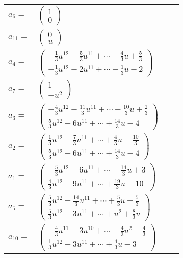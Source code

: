 \documentclass[1p]{elsarticle_modified}
\theoremstyle{definition}
\begin{document}
\begin{tabular}{m{7pt} m{180pt} m{7pt} m{180pt} }
\flushright $a_{6}=$&$\begin{pmatrix}1\\0\end{pmatrix}$ \\
\flushright $a_{11}=$&$\begin{pmatrix}0\\u\end{pmatrix}$ \\
\flushright $a_{4}=$&$\begin{pmatrix}-\frac{1}{3} u^{12}+\frac{5}{3} u^{11}+\cdots-\frac{4}{3} u+\frac{5}{3}\\-\frac{1}{3} u^{12}+2 u^{11}+\cdots-\frac{1}{3} u+2\end{pmatrix}$ \\
\flushright $a_{7}=$&$\begin{pmatrix}1\\- u^2\end{pmatrix}$ \\
\flushright $a_{3}=$&$\begin{pmatrix}-\frac{4}{3} u^{12}+\frac{11}{3} u^{11}+\cdots-\frac{10}{3} u+\frac{2}{3}\\\frac{5}{3} u^{12}-6 u^{11}+\cdots+\frac{14}{3} u-4\end{pmatrix}$ \\
\flushright $a_{2}=$&$\begin{pmatrix}\frac{1}{3} u^{12}-\frac{7}{3} u^{11}+\cdots+\frac{4}{3} u-\frac{10}{3}\\\frac{5}{3} u^{12}-6 u^{11}+\cdots+\frac{14}{3} u-4\end{pmatrix}$ \\
\flushright $a_{1}=$&$\begin{pmatrix}-\frac{5}{3} u^{12}+6 u^{11}+\cdots-\frac{14}{3} u+3\\\frac{4}{3} u^{12}-9 u^{11}+\cdots+\frac{19}{3} u-10\end{pmatrix}$ \\
\flushright $a_{5}=$&$\begin{pmatrix}\frac{5}{3} u^{12}-\frac{14}{3} u^{11}+\cdots+\frac{5}{3} u-\frac{5}{3}\\\frac{5}{3} u^{12}-3 u^{11}+\cdots+u^2+\frac{8}{3} u\end{pmatrix}$ \\
\flushright $a_{10}=$&$\begin{pmatrix}-\frac{4}{3} u^{11}+3 u^{10}+\cdots-\frac{4}{3} u^2-\frac{4}{3}\\\frac{1}{3} u^{12}-3 u^{11}+\cdots+\frac{4}{3} u-3\end{pmatrix}$ \\

\end{tabular}
\end{document}
